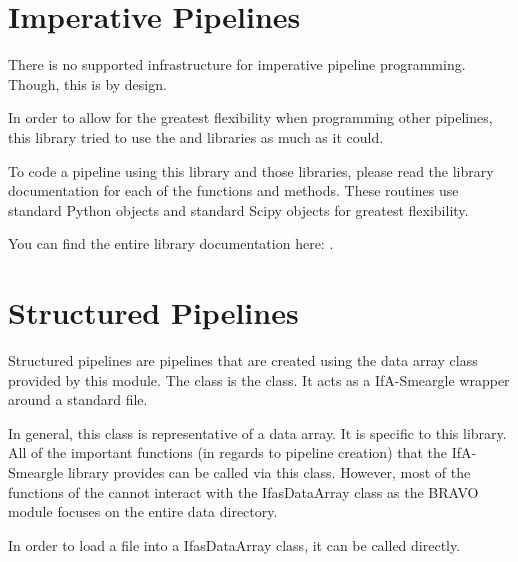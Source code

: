 \documentclass[letterpaper,10pt,english]{sphinxmanual}
\begin{document}
\section{Imperative Pipelines}
\label{\detokenize{creating_pipelines:imperative-pipelines}}
There is no supported infrastructure for imperative pipeline programming.
Though, this is by design.

In order to allow for the greatest flexibility
when programming other pipelines, this library tried to use the  and 
libraries as much as it could.

To code a pipeline using this library and those libraries, please read the
library documentation for each of the functions and methods. These
routines use standard Python objects and standard Scipy objects for
greatest flexibility.

You can find the entire library documentation here: {\hyperref[\detokenize{python_docstrings/IfA_Smeargle::doc}]{}}.


\section{Structured Pipelines}
\label{\detokenize{creating_pipelines:structured-pipelines}}
Structured pipelines are pipelines that are created using the data array
class provided by this module. The class is the
{\hyperref[\detokenize{python_docstrings/IfA_Smeargle.zulu.zulu_main:IfA_Smeargle.zulu.zulu_main.IfasDataArray}]{}}
class. It acts as a IfA-Smeargle wrapper around a standard  file.

In general, this class is representative of a data array. It is specific
to this library. All of the important functions (in regards to pipeline
creation) that the IfA-Smeargle library provides can be called via this
class. However, most of the functions of the
{\hyperref[\detokenize{python_docstrings/IfA_Smeargle.bravo::doc}]{}} cannot
interact with the IfasDataArray class as the BRAVO module focuses on the
entire data directory.

In order to load a  file into a IfasDataArray class, it can
be called directly.
\end{document}
